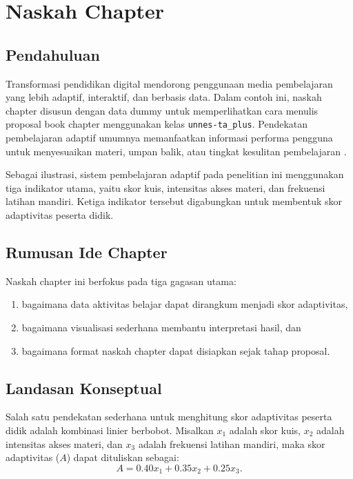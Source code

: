 \documentclass[proposal-bookchapter]{unnes-ta_plus}
\begin{document}
\maketitleunnes
\unnesPersetujuanPembimbing
\tableofcontents
\clearpage

\unnesMainMatter

\chapter{Naskah Chapter}

% 

\section{Pendahuluan}
Transformasi pendidikan digital mendorong penggunaan media pembelajaran yang lebih adaptif, interaktif, dan berbasis data. Dalam contoh ini, naskah chapter disusun dengan data dummy untuk memperlihatkan cara menulis proposal book chapter menggunakan kelas \texttt{unnes-ta\_plus}. Pendekatan pembelajaran adaptif umumnya memanfaatkan informasi performa pengguna untuk menyesuaikan materi, umpan balik, atau tingkat kesulitan pembelajaran \cite{rahman2022,sari2023}.

Sebagai ilustrasi, sistem pembelajaran adaptif pada penelitian ini menggunakan tiga indikator utama, yaitu skor kuis, intensitas akses materi, dan frekuensi latihan mandiri. Ketiga indikator tersebut digabungkan untuk membentuk skor adaptivitas peserta didik.

\section{Rumusan Ide Chapter}
Naskah chapter ini berfokus pada tiga gagasan utama:
\begin{enumerate}
    \item bagaimana data aktivitas belajar dapat dirangkum menjadi skor adaptivitas,
    \item bagaimana visualisasi sederhana membantu interpretasi hasil, dan
    \item bagaimana format naskah chapter dapat disiapkan sejak tahap proposal.
\end{enumerate}

\section{Landasan Konseptual}
Salah satu pendekatan sederhana untuk menghitung skor adaptivitas peserta didik adalah kombinasi linier berbobot. Misalkan $x_1$ adalah skor kuis, $x_2$ adalah intensitas akses materi, dan $x_3$ adalah frekuensi latihan mandiri, maka skor adaptivitas ($A$) dapat dituliskan sebagai:
\begin{equation}
A = 0.40x_1 + 0.35x_2 + 0.25x_3.
\end{equation}
\end{document}
